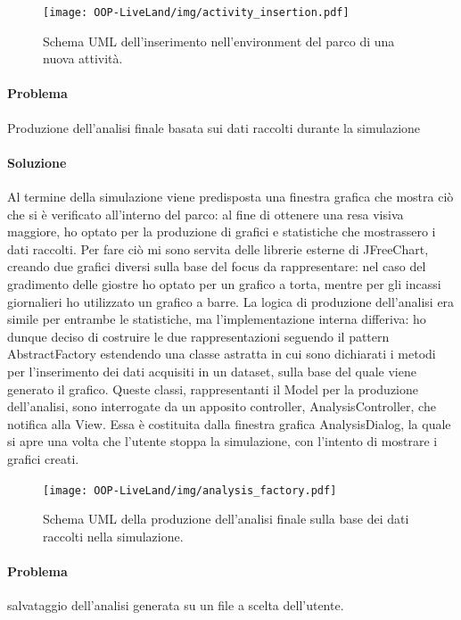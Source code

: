 \documentclass[a4paper,12pt]{report}
\begin{document}
\begin{figure}[h]
\centering{}
\texttt{[image: OOP-LiveLand/img/activity\_insertion.pdf]}
\caption{Schema UML dell'inserimento nell'environment del parco di una nuova attività.}
\label{img:activity_insertion}
\end{figure}

\paragraph{Problema} Produzione dell'analisi finale basata sui dati raccolti durante la simulazione
\paragraph{Soluzione} Al termine della simulazione viene predisposta una finestra grafica che mostra ciò che si è verificato all’interno del parco: al fine di ottenere una resa visiva maggiore, ho optato per la produzione di grafici e statistiche che mostrassero i dati raccolti. Per fare ciò mi sono servita delle librerie esterne di JFreeChart, creando due grafici diversi sulla base del focus da rappresentare: nel caso del gradimento delle giostre ho optato per un grafico a torta, mentre per gli incassi giornalieri ho utilizzato un grafico a barre. La logica di produzione dell’analisi era simile per entrambe le statistiche, ma l’implementazione interna differiva: ho dunque deciso di costruire le due rappresentazioni seguendo il pattern AbstractFactory estendendo una classe astratta in cui sono dichiarati i metodi per l’inserimento dei dati acquisiti in un dataset, sulla base del quale viene generato il grafico. Queste classi, rappresentanti il Model per la produzione dell’analisi, sono interrogate da un apposito controller, AnalysisController, che notifica alla View. Essa è costituita dalla finestra grafica AnalysisDialog, la quale si apre una volta che l’utente stoppa la simulazione, con l’intento di mostrare i grafici creati.

\begin{figure}[h]
\centering{}
\texttt{[image: OOP-LiveLand/img/analysis\_factory.pdf]}
\caption{Schema UML della produzione dell'analisi finale sulla base dei dati raccolti nella simulazione.}
\label{img:analysis_factory}
\end{figure}

\paragraph{Problema} salvataggio dell'analisi generata su un file a scelta dell'utente.
\end{document}
